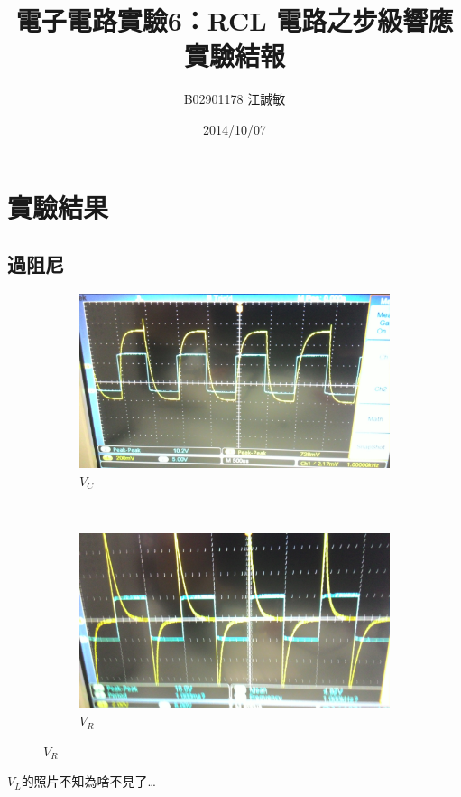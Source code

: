 \documentclass[12pt, a4paper]{article}
\title{ \bf {\Huge 電子電路實驗6：RCL 電路之步級響應}\\ 實驗結報}
\author{B02901178 江誠敏}
\date{2014/10/07}
\begin{document}
\maketitle

\section{實驗結果}
\subsection{過阻尼}
\begin{figure}[H]
  \centering
  \begin{subfigure}[b]{0.4\textwidth}
    \includegraphics[width=1\textwidth]{data/pic/P_20141118_184858.jpg}
    \caption{$V_C$}
  \end{subfigure}
  ~
  \begin{subfigure}[b]{0.4\textwidth}
    \includegraphics[width=1\textwidth]{data/pic/P_20141118_185319.jpg}
    \caption{$V_R$}
  \end{subfigure}
\end{figure}
$V_L$的照片不知為啥不見了…
\end{document}
